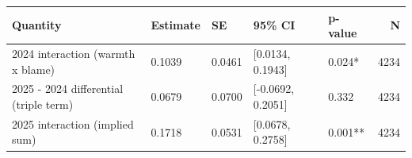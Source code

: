 
\begin{tabular}[t]{lllllr}
\toprule
Quantity & Estimate & SE & 95\% CI & p-value & N\\
\midrule
2024 interaction (warmth x blame) & 0.1039 & 0.0461 & {}[0.0134, 0.1943] & 0.024* & 4234\\
2025 - 2024 differential (triple term) & 0.0679 & 0.0700 & {}[-0.0692, 0.2051] & 0.332 & 4234\\
2025 interaction (implied sum) & 0.1718 & 0.0531 & {}[0.0678, 0.2758] & 0.001** & 4234\\
\bottomrule
\end{tabular}
